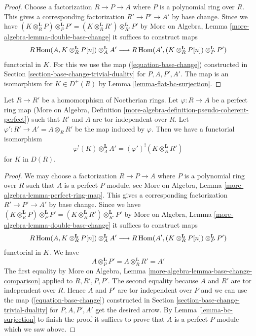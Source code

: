 \begin{proof}
Choose a factorization $R \to P \to A$ where $P$ is a polynomial ring over $R$.
This gives a corresponding factorization $R' \to P' \to A'$ by base change.
Since we have $(K \otimes_R^\mathbf{L} P) \otimes_P^\mathbf{L} P' =
(K \otimes_R^\mathbf{L} R') \otimes_{R'}^\mathbf{L} P'$
by More on Algebra, Lemma \ref{more-algebra-lemma-double-base-change}
it suffices to construct maps
$$
R\mathop{\mathrm{Hom}}\nolimits(A, K \otimes_R^\mathbf{L} P[n]) \otimes_A^\mathbf{L} A'
\longrightarrow
R\mathop{\mathrm{Hom}}\nolimits(A', (K \otimes_R^\mathbf{L} P[n]) \otimes_P^\mathbf{L} P')
$$
functorial in $K$. For this we use the map (\ref{equation-base-change})
constructed in Section \ref{section-base-change-trivial-duality}
for $P, A, P', A'$.
The map is an isomorphism for $K \in D^+(R)$ by
Lemma \ref{lemma-flat-bc-surjection}.
\end{proof}

\begin{lemma}
\label{lemma-bc}
Let $R \to R'$ be a homomorphism of Noetherian rings.
Let $\varphi : R \to A$ be a perfect ring map
(More on Algebra, Definition
\ref{more-algebra-definition-pseudo-coherent-perfect})
such that $R'$ and $A$ are tor independent over $R$.
Let $\varphi' : R' \to A' = A \otimes_R R'$ be the map induced by $\varphi$.
Then we have a functorial isomorphism
$$
\varphi^!(K) \otimes_A^\mathbf{L} A' =
(\varphi')^!(K \otimes_R^\mathbf{L} R')
$$
for $K$ in $D(R)$.
\end{lemma}

\begin{proof}
We may choose a factorization $R \to P \to A$ where $P$
is a polynomial ring over $R$ such that $A$ is a perfect $P$-module, see
More on Algebra, Lemma \ref{more-algebra-lemma-perfect-ring-map}.
This gives a corresponding factorization $R' \to P' \to A'$ by base change.
Since we have $(K \otimes_R^\mathbf{L} P) \otimes_P^\mathbf{L} P' =
(K \otimes_R^\mathbf{L} R') \otimes_{R'}^\mathbf{L} P'$
by More on Algebra, Lemma \ref{more-algebra-lemma-double-base-change}
it suffices to construct maps
$$
R\mathop{\mathrm{Hom}}\nolimits(A, K \otimes_R^\mathbf{L} P[n]) \otimes_A^\mathbf{L} A'
\longrightarrow
R\mathop{\mathrm{Hom}}\nolimits(A', (K \otimes_R^\mathbf{L} P[n]) \otimes_P^\mathbf{L} P')
$$
functorial in $K$. We have
$$
A \otimes_P^\mathbf{L} P' = A \otimes_R^\mathbf{L} R' = A'
$$
The first equality by
More on Algebra, Lemma \ref{more-algebra-lemma-base-change-comparison}
applied to $R, R', P, P'$. The second equality because
$A$ and $R'$ are tor independent over $R$. Hence $A$ and $P'$ are
tor independent over $P$ and we can use the map (\ref{equation-base-change})
constructed in Section \ref{section-base-change-trivial-duality} for
$P, A, P', A'$
get the desired arrow. By Lemma \ref{lemma-bc-surjection}
to finish the proof it suffices to prove that $A$ is a perfect $P$-module
which we saw above.
\end{proof}

